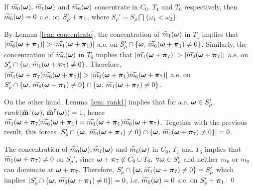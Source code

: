 \begin{proposition}\label{prop: zero-corner}
If  $\widetilde{m_{0}}(\boldsymbol{\omega}),\,\widetilde{m_{1}}(\boldsymbol{\omega})$ and $\widetilde{m_{6}}(\boldsymbol{\omega})$ concentrate in $C_0,\,T_1$ and $T_6$ respectively, then $\widetilde{m_{6}}(\boldsymbol{\omega})=0$ a.e. on $S_\rho'+\boldsymbol{\pi}_1$, where $S_\rho' =  S_\rho\bigcap\{\omega_1<\omega_2\}$.
\end{proposition}
By Lemma \ref{lem: concentrate}, the concentration of $\widetilde{m_{1}}(\boldsymbol{\omega})$ in $T_1$ implies that $|\widetilde{m_6}(\boldsymbol{\omega}+\boldsymbol{\pi}_1)| > |\widetilde{m_1}(\boldsymbol{\omega}+\boldsymbol{\pi}_1)|$ a.e. on $S_\rho'\cap \{\boldsymbol{\omega},\,\widetilde{m_6}(\boldsymbol{\omega}+\boldsymbol{\pi}_1)\neq 0\}$. Similarly, the concentration of $\widetilde{m_{6}}(\boldsymbol{\omega})$ in $T_6$ implies that $|\widetilde{m_1}(\boldsymbol{\omega}+\boldsymbol{\pi}_7)| > |\widetilde{m_6}(\boldsymbol{\omega}+\boldsymbol{\pi}_7)|$ a.e. on $S_\rho'\cap \{\boldsymbol{\omega},\,\widetilde{m_1}(\boldsymbol{\omega}+\boldsymbol{\pi}_7)\neq 0\}$. Therefore, $|\widetilde{m_1}(\boldsymbol{\omega}+\boldsymbol{\pi}_7)\widetilde{m_6}(\boldsymbol{\omega} + \boldsymbol{\pi}_1)| > |\widetilde{m_1}(\boldsymbol{\omega}+\boldsymbol{\pi}_1)\widetilde{m_6}(\boldsymbol{\omega}+\boldsymbol{\pi}_7)|$ a.e. on $S_\rho'\cap \{\boldsymbol{\omega},\,\widetilde{m_6}(\boldsymbol{\omega}+\boldsymbol{\pi}_1)\neq 0\}\cap \{\boldsymbol{\omega},\,\widetilde{m_1}(\boldsymbol{\omega}+\boldsymbol{\pi}_7)\neq 0\}$.

On the other hand, Lemma \ref{lem: rank1} implies that for a.e. $\boldsymbol{\omega}\in S_\rho'$, $rank(\widetilde{\mathbf{m}}^{1}(\boldsymbol{\omega}),\,\widetilde{\mathbf{m}}^{7}(\boldsymbol{\omega})) = 1$, hence $\widetilde{m_1}(\boldsymbol{\omega}+\boldsymbol{\pi}_7)\widetilde{m_6}(\boldsymbol{\omega} + \boldsymbol{\pi}_1) = \widetilde{m_1}(\boldsymbol{\omega}+\boldsymbol{\pi}_1)\widetilde{m_6}(\boldsymbol{\omega}+\boldsymbol{\pi}_7)$. Together with the previous result, this forces $|S_\rho'\cap \{\boldsymbol{\omega},\,\widetilde{m_6}(\boldsymbol{\omega}+\boldsymbol{\pi}_1)\neq 0\}\cap \{\boldsymbol{\omega},\,\widetilde{m_1}(\boldsymbol{\omega}+\boldsymbol{\pi}_7)\neq 0\}| = 0$.

The concentration of $\widetilde{m_{0}}(\boldsymbol{\omega}),\widetilde{m_{1}}(\boldsymbol{\omega})$ and $\widetilde{m_{6}}(\boldsymbol{\omega})$ in $C_0,\,T_1$ and $T_6$ implies that $\widetilde{m_1}(\boldsymbol{\omega}+\boldsymbol{\pi}_7)\neq 0$ on $S_\rho'$, since $\boldsymbol{\omega}+\boldsymbol{\pi}_7\not \in C_0\cup T_6,\; \forall \boldsymbol{\omega}\in S_\rho'$ and neither $\widetilde{m_6}$ or $\widetilde{m_0}$ can dominate at $\boldsymbol{\omega}+\boldsymbol{\pi}_7$.
Therefore, $S_\rho'\cap\{\boldsymbol{\omega},\widetilde{m_1}(\boldsymbol{\omega}+\boldsymbol{\pi}_7)\neq 0\} = S_\rho'$ which implies $|S_\rho'\cap\{\boldsymbol{\omega},\,\widetilde{m_6}(\boldsymbol{\omega}+\boldsymbol{\pi}_1)\neq 0\}|=0$, i.e. $\widetilde{m_{6}}(\boldsymbol{\omega})=0$ a.e. on $S_\rho'+\boldsymbol{\pi}_1$.
\qed

